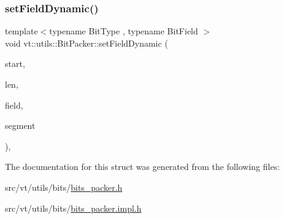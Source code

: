 \subsubsection{\texorpdfstring{set\+Field\+Dynamic()}{setFieldDynamic()}}
{\footnotesize\ttfamily template$<$typename Bit\+Type , typename Bit\+Field $>$ \\
void vt\+::utils\+::\+Bit\+Packer\+::set\+Field\+Dynamic (\begin{DoxyParamCaption}\item[{\hyperlink{structvt_1_1utils_1_1_bit_packer_a23024285425933c1f10c8fc3942f9beb}{Field\+Type}}]{start,  }\item[{\hyperlink{structvt_1_1utils_1_1_bit_packer_a23024285425933c1f10c8fc3942f9beb}{Field\+Type}}]{len,  }\item[{Bit\+Field \&}]{field,  }\item[{Bit\+Type const \&}]{segment }\end{DoxyParamCaption})\hspace{0.3cm}{\ttfamily [inline]}, {\ttfamily [static]}}



The documentation for this struct was generated from the following files\+:\begin{DoxyCompactItemize}
\item 
src/vt/utils/bits/\hyperlink{bits__packer_8h}{bits\+\_\+packer.\+h}\item 
src/vt/utils/bits/\hyperlink{bits__packer_8impl_8h}{bits\+\_\+packer.\+impl.\+h}\end{DoxyCompactItemize}
